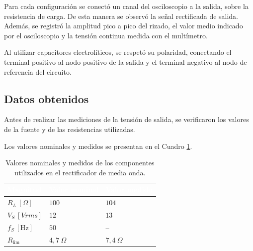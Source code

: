 Para cada configuración se conectó un canal del osciloscopio a la salida, sobre la resistencia de carga. De esta manera se observó la señal rectificada de salida. Además, se registró la amplitud pico a pico del rizado, el valor medio indicado por el osciloscopio y la tensión continua medida
con el multímetro.

Al utilizar capacitores electrolíticos, se respetó su polaridad, conectando el terminal positivo al nodo positivo de la salida y el terminal negativo al nodo de referencia del circuito.

\subsection{Datos obtenidos}

Antes de realizar las mediciones de la tensión de salida, se verificaron los valores de la fuente y de las resistencias utilizadas.

Los valores nominales y medidos se presentan en el Cuadro
\ref{tab:parametros_media_onda}.

\begin{table}[H]
    \centering
    \renewcommand{\arraystretch}{1.4}
    \setlength{\arrayrulewidth}{0.5pt}

    \begin{tabular}{|
        >{\centering\arraybackslash}m{4.5cm}|
        >{\centering\arraybackslash}m{3cm}|
        >{\centering\arraybackslash}m{3cm}|}
        \hline

        \rowcolor{headercolor}
        \textcolor{white}{\textbf{Magnitud}} &
        \textcolor{white}{\textbf{Valor nominal}} &
        \textcolor{white}{\textbf{Valor medido}} \\
        \hline

        \rowcolor{rowcolor}
        $R_L \ [\Omega]$ &
        $100$ &
        $104$ \\
        \hline

        $V_S \ [V rms]$ &
        $12$ &
        $13$ \\
        \hline

        \rowcolor{rowcolor}
         $f_S \ [\mathrm{Hz}]$ &
        $50$ &
        -- \\
        \hline

        $R_{\lim}$ &
        $4{,}7\ \Omega$ &
        $7{,}4\ \Omega$ \\
        \hline

    \end{tabular}

    \caption{Valores nominales y medidos de los componentes utilizados en el rectificador de media onda.}
    \label{tab:parametros_media_onda}
\end{table}

